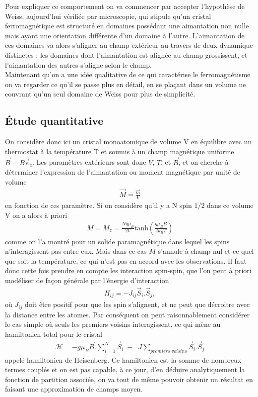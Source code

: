 \documentclass[12pt,prb,aps,epsf]{article}
\begin{document}
Pour expliquer ce comportement on va commencer par accepter l'hypothèse de Weiss, aujourd'hui vérifiée par microscopie, qui stipule qu'un cristal ferromagnétique est structuré en domaines possédant une aimantation non nulle mais ayant une orientation différente d'un domaine à l'autre. L'aimantation de ces domaines va alors s'aligner au champ extérieur au travers de deux dynamique distinctes : les domaines dont l'aimantation est alignée au champ grossissent, et l'aimantation des autres s'aligne selon le champ.\\

Maintenant qu'on a une idée qualitative de ce qui caractérise le ferromagnétisme on va regarder ce qu'il se passe plus en détail, en se plaçant dans un volume ne couvrant qu'un seul domaine de Weiss pour plus de simplicité.

\subsection{Étude quantitative}
On considère donc ici un cristal monoatomique de volume V en équilibre avec un thermostat à la température T et soumis à un champ magnétique uniforme $\vec{B} = B\vec{e}_z$. Les paramètres extérieurs sont donc $V$, $T$, et $\vec{B}$, et on cherche à déterminer l'expression de l'aimantation ou moment magnétique par unité de volume 
\begin{eqnarray}
\vec{M} = \frac{\vec{m}}{V}
\end{eqnarray}
en fonction de ces paramètre. Si on considère qu'il y a N spin $1/2$ dans ce volume V on a alors à priori 
\begin{eqnarray}
M = M_z  = \frac{Ng\mu_B}{2V} \mathrm{tanh}\left(\frac{g\mu_B B}{2k_BT}\right)
\end{eqnarray}
comme on l'a montré pour un solide paramagnétique dans lequel les spins n'interagissent pas entre eux. Mais dans ce cas $M$ s'annule à champ nul et ce quel que soit la température, ce qui n'est pas en accord avec les observations. Il faut donc cette fois prendre en compte les interaction spin-spin, que l'on peut à priori modéliser de façon générale par l'énergie d'interaction 
\begin{eqnarray}
H_{ij} = -J_{ij}\vec{S}_i.\vec{S}_j,
\end{eqnarray}
où $J_{ij}$ doit être positif pour que les spin s'alignent, et ne peut que décroitre avec la distance entre les atomes. Par conséquent on peut raisonnablement considérer le cas simple où seuls les premiers voisins interagissent, ce qui mène au hamiltonien total pour le cristal 
\begin{eqnarray}
\mathcal{H} = -g\mu_B \vec{B}.\sum_{i=1}^N \vec{S}_i \;-\; \;J\sum_{premiers\;voisins} \vec{S}_i.\vec{S}_j
\end{eqnarray}
appelé hamiltonien de Heisenberg. Ce hamiltonien est la somme de nombreux termes couplés et on est pas capable, à ce jour, d'en déduire analytiquement la fonction de partition associée, on va tout de même pouvoir obtenir un résultat en faisant une approximation de champs moyen.
\end{document}
